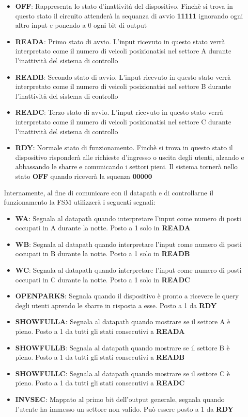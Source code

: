 \documentclass[
  12pt,
  a4paper,
  headings=optiontoheadandtoc
]{scrreprt}
\begin{document}
\begin{itemize}
  \item \textbf{OFF}: Rappresenta lo stato d'inattività del dispositivo. Finchè si trova in questo stato il circuito attenderà la sequanza di avvio \textbf{11111} ignorando ogni altro input e ponendo a 0 ogni bit di output
  \item \textbf{READA}: Primo stato di avvio. L'input ricevuto in questo stato verrà interpretato come il numero di veicoli posizionatisi nel settore A durante l'inattività del sistema di controllo
  \item \textbf{READB}: Secondo stato di avvio. L'input ricevuto in questo stato verrà interpretato come il numero di veicoli posizionatisi nel settore B durante l'inattività del sistema di controllo
  \item \textbf{READC}: Terzo stato di avvio. L'input ricevuto in questo stato verrà interpretato come il numero di veicoli posizionatisi nel settore C durante l'inattività del sistema di controllo
  \item \textbf{RDY}: Normale stato di funzionamento. Finchè si trova in questo stato il dispositivo risponderà alle richieste d'ingresso o uscita degli utenti, alzando e abbassando le sbarre e comunicando i settori pieni. Il sistema tornerà nello stato \textbf{OFF} quando riceverà la squenza \textbf{00000}
\end{itemize}

Internamente, al fine di comunicare con il datapath e di controllarne il funzionamento la FSM utilizzerà i seguenti segnali:

\begin{itemize}
  \item \textbf{WA}: Segnala al datapath quando interpretare l'input come numero di posti occupati in A durante la notte. Posto a 1 solo in \textbf{READA}
  \item \textbf{WB}: Segnala al datapath quando interpretare l'input come numero di posti occupati in B durante la notte. Posto a 1 solo in \textbf{READB}
  \item \textbf{WC}: Segnala al datapath quando interpretare l'input come numero di posti occupati in C durante la notte. Posto a 1 solo in \textbf{READC}
  \item \textbf{OPENPARKS}: Segnala quando il dispositivo è pronto a ricevere le query degli utenti aprendo le sbarre in risposta a esse. Posto a 1 da \textbf{RDY}
  \item \textbf{SHOWFULLA}: Segnala al datapath quando mostrare se il settore A è pieno. Posto a 1 da tutti gli stati consecutivi a \textbf{READA}
  \item \textbf{SHOWFULLB}: Segnala al datapath quando mostrare se il settore B è pieno. Posto a 1 da tutti gli stati consecutivi a \textbf{READB}
  \item \textbf{SHOWFULLC}: Segnala al datapath quando mostrare se il settore C è pieno. Posto a 1 da tutti gli stati consecutivi a \textbf{READC}
  \item \textbf{INVSEC}: Mappato al primo bit dell'output generale, segnala quando l'utente ha immesso un settore non valido. Può essere posto a 1 da \textbf{RDY}
\end{itemize}
\end{document}
